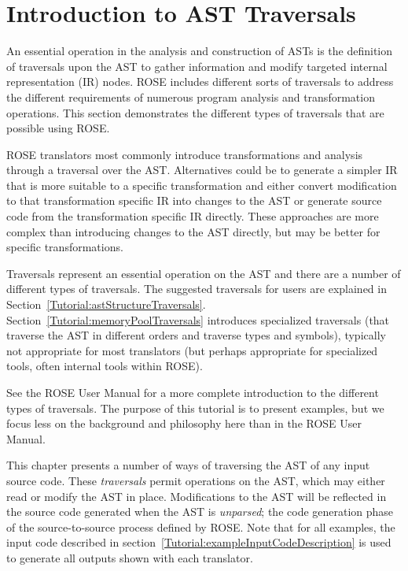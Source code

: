 \chapter{Introduction to AST Traversals}
\label{chap:traversals}

    An essential operation in the analysis and construction of ASTs is the
definition of traversals upon the AST to gather information and modify
targeted internal representation (IR) nodes.  ROSE includes different
sorts of traversals to address the different requirements of numerous
program analysis and transformation operations.  This section demonstrates
the different types of traversals that are possible using ROSE.

    ROSE translators most commonly introduce transformations and analysis
through a traversal over the AST.  Alternatives could be to generate
a simpler IR that is more suitable to a specific transformation and
either convert modification to that transformation specific IR
into changes to the AST or generate source code from the transformation specific
IR directly.  These approaches are more complex than introducing changes
to the AST directly, but may be better for specific transformations.

   Traversals represent an essential operation on the AST and there are a
number of different types of traversals.  The suggested traversals for users
are explained in Section~\ref{Tutorial:astStructureTraversals}.
Section~\ref{Tutorial:memoryPoolTraversals} introduces specialized traversals
(that traverse the AST in different orders and traverse types and symbols),
typically not appropriate for most translators (but perhaps appropriate for
specialized tools, often internal tools within ROSE).

See the ROSE User Manual for a more complete introduction to the different types of
traversals.  The purpose of this tutorial is to present examples, but we focus less on
the background and philosophy here than in the ROSE User Manual.


   This chapter presents a number of ways of traversing the AST
of any input source code.  These {\em traversals} permit operations
on the AST, which may either read or modify the AST in place.  Modifications
to the AST will be reflected in the source code generated when the AST is 
{\em unparsed}; the code generation phase of the source-to-source process
defined by ROSE.  Note that for all examples, the input code described in 
section~\ref{Tutorial:exampleInputCodeDescription} is used to generate
all outputs shown with each translator.


